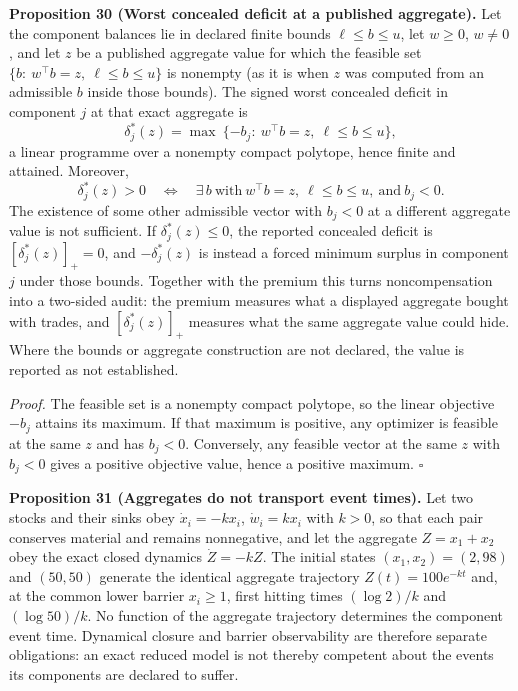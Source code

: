 \documentclass[11pt]{article}
\begin{document}
\textbf{Proposition 30 (Worst concealed deficit at a published aggregate).} Let the component balances lie in declared finite bounds \(\ell\le b\le u\), let \(w\ge0\), \(w\ne0\), and let \(z\) be a published aggregate value for which the feasible set \(\{b:\ w^{\top}b=z,\ \ell\le b\le u\}\) is nonempty (as it is when \(z\) was computed from an admissible \(b\) inside those bounds). The signed worst concealed deficit in component \(j\) at that exact aggregate is
$$\delta^{*}_j(z)=\max\ \{-b_j:\ w^{\top}b=z,\ \ell\le b\le u\},$$
a linear programme over a nonempty compact polytope, hence finite and attained. Moreover,
$$\delta^{*}_j(z)>0\quad\Longleftrightarrow\quad \exists\, b\ \text{with}\ w^{\top}b=z,\ \ell\le b\le u,\ \text{and}\ b_j<0.$$
The existence of some other admissible vector with \(b_j<0\) at a different aggregate value is not sufficient. If \(\delta^{*}_j(z)\le0\), the reported concealed deficit is \([\delta^{*}_j(z)]_+=0\), and \(-\delta^{*}_j(z)\) is instead a forced minimum surplus in component \(j\) under those bounds. Together with the premium this turns noncompensation into a two-sided audit: the premium measures what a displayed aggregate bought with trades, and \([\delta^{*}_j(z)]_+\) measures what the same aggregate value could hide. Where the bounds or aggregate construction are not declared, the value is reported as not established.

\emph{Proof.} The feasible set is a nonempty compact polytope, so the linear objective \(-b_j\) attains its maximum. If that maximum is positive, any optimizer is feasible at the same \(z\) and has \(b_j<0\). Conversely, any feasible vector at the same \(z\) with \(b_j<0\) gives a positive objective value, hence a positive maximum. \(\square\)

\textbf{Proposition 31 (Aggregates do not transport event times).} Let two stocks and their sinks obey \(\dot x_i=-kx_i\), \(\dot w_i=kx_i\) with \(k>0\), so that each pair conserves material and remains nonnegative, and let the aggregate \(Z=x_1+x_2\) obey the exact closed dynamics \(\dot Z=-kZ\). The initial states \((x_1,x_2)=(2,98)\) and \((50,50)\) generate the identical aggregate trajectory \(Z(t)=100e^{-kt}\) and, at the common lower barrier \(x_i\ge1\), first hitting times \((\log2)/k\) and \((\log50)/k\). No function of the aggregate trajectory determines the component event time. Dynamical closure and barrier observability are therefore separate obligations: an exact reduced model is not thereby competent about the events its components are declared to suffer.
\end{document}
